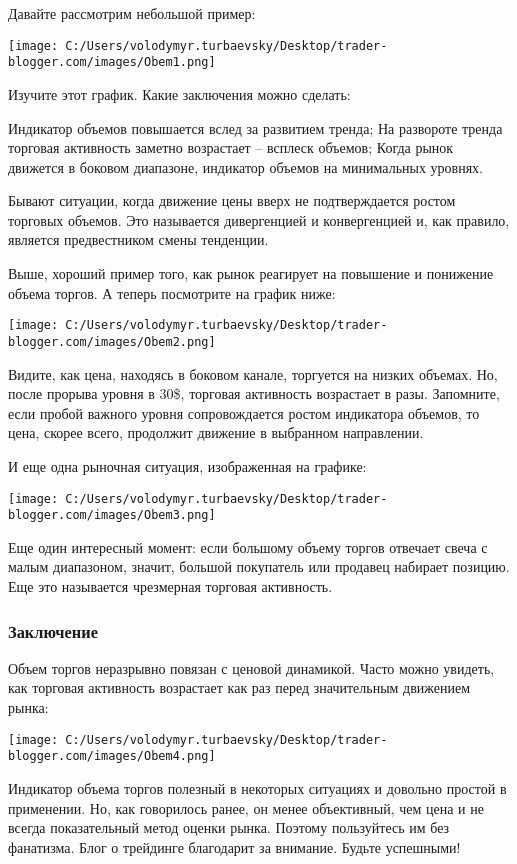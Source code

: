 \documentclass[a5paper]{article}
\begin{document}
Давайте рассмотрим небольшой пример:

\texttt{[image: C:/Users/volodymyr.turbaevsky/Desktop/trader-blogger.com/images/Obem1.png]}

 Изучите этот график. Какие заключения можно сделать:

    Индикатор объемов повышается вслед за развитием тренда;
    На развороте тренда торговая активность заметно возрастает – всплеск объемов;
    Когда рынок движется в боковом диапазоне, индикатор объемов на минимальных уровнях.

Бывают ситуации, когда движение цены вверх не подтверждается ростом торговых объемов. Это называется дивергенцией и конвергенцией и, как правило, является предвестником смены тенденции.

Выше, хороший пример того, как рынок реагирует на повышение и
понижение объема торгов. А теперь посмотрите на график ниже:

\texttt{[image: C:/Users/volodymyr.turbaevsky/Desktop/trader-blogger.com/images/Obem2.png]}

Видите, как цена, находясь в боковом канале, торгуется на низких объемах. Но, после прорыва уровня в 30\$, торговая активность возрастает в разы. Запомните, если пробой важного уровня сопровождается ростом индикатора объемов, то цена, скорее всего, продолжит движение в выбранном направлении.

И еще одна рыночная ситуация, изображенная на графике:

\texttt{[image: C:/Users/volodymyr.turbaevsky/Desktop/trader-blogger.com/images/Obem3.png]}

Еще один интересный момент: если большому объему торгов отвечает свеча с малым диапазоном, значит, большой покупатель или продавец набирает позицию. Еще это называется чрезмерная торговая активность.

\subsubsection{Заключение}

Объем торгов неразрывно повязан с ценовой динамикой. Часто можно
увидеть, как торговая активность возрастает как раз перед значительным
движением рынка:

\texttt{[image: C:/Users/volodymyr.turbaevsky/Desktop/trader-blogger.com/images/Obem4.png]}

Индикатор объема торгов полезный в некоторых ситуациях и довольно простой в применении. Но, как говорилось ранее, он менее объективный, чем цена и не всегда показательный метод оценки рынка. Поэтому пользуйтесь им без фанатизма. Блог о трейдинге благодарит за внимание. Будьте успешными!
\end{document}
